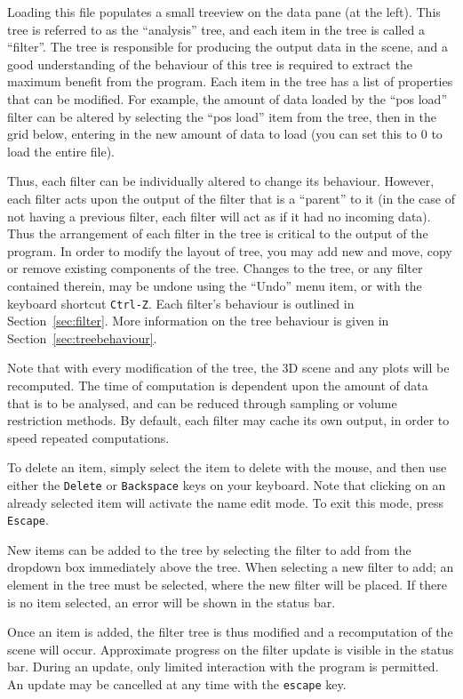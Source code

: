 \documentclass[10pt]{article}
\begin{document}
Loading this file populates a small treeview on the data pane (at the left). This tree is referred to as the ``analysis'' tree, and each item in the tree is called a ``filter''. The tree is responsible for producing the output data in the scene, and a good understanding of the behaviour of this tree is required to extract the maximum benefit from the program. Each item in the tree has a list of properties that can be modified. For example, the amount of data loaded by the ``pos load'' filter can be altered by selecting the ``pos load'' item from the tree, then in the grid below, entering in the new amount of data to load (you can set this to 0 to load the entire file). 

Thus, each filter can be individually altered to change its behaviour. However, each filter acts upon the output of the filter that is a ``parent'' to it (in the case of not having a previous filter, each filter will act as if it had no incoming data). Thus the arrangement of each filter in the tree is critical to the output of the program. In order to modify the  layout of tree, you may add new and move, copy or remove existing components of the tree.  Changes to the tree, or any filter contained therein, may be undone using the ``Undo'' menu item, or with the keyboard shortcut \texttt{Ctrl-Z}.  Each filter's behaviour is outlined in Section~\ref{sec:filter}. More information on the tree behaviour is given in Section~\ref{sec:treebehaviour}.

Note that with every modification of the tree, the 3D scene and any plots will be recomputed. The time of computation is dependent upon the amount of data that is to be analysed, and can be reduced through sampling or volume restriction methods. By default, each filter may cache its own output, in order to speed repeated computations.

To delete an item, simply select the item to delete with the mouse, and then use either the \texttt{Delete}  or  \texttt{Backspace} keys on your keyboard. Note that clicking on an already selected item will activate the name edit mode. To exit this mode, press \texttt{Escape}. 

New items can be added to the tree by selecting the filter to add from the dropdown box immediately above the tree. When selecting a new filter to add; an element in the tree must be selected, where the new filter will be placed. If there is no item selected, an error will be shown in the status bar.  

Once an item is added, the filter tree is thus modified and a recomputation of the scene will occur. Approximate progress on the filter update is visible in the status bar. During an update, only limited interaction with the program is permitted. An update may be cancelled at any time with the \texttt{escape} key. 
\end{document}
